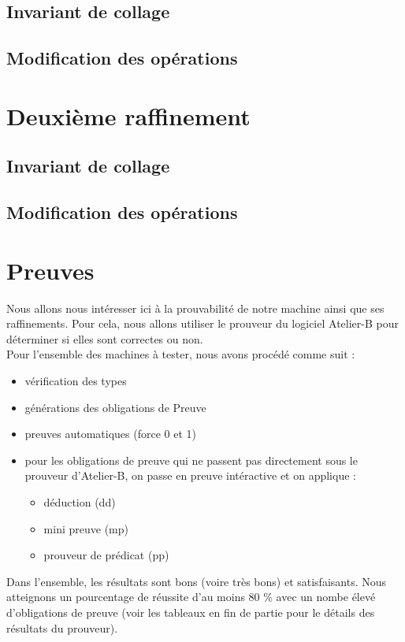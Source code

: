 \documentclass[12pt]{article}
\begin{document}
\subsection{Invariant de collage}
\subsection{Modification des opérations}
\newpage
\section{Deuxième raffinement}
\subsection{Invariant de collage}
\subsection{Modification des opérations}
\newpage
\section{Preuves}
Nous allons nous intéresser ici à la prouvabilité de notre machine ainsi que ses raffinements. Pour cela, nous allons utiliser le prouveur du logiciel Atelier-B pour déterminer si elles sont correctes ou non.\\

Pour l'ensemble des machines à tester, nous avons procédé comme suit :
\begin{itemize}
  \item vérification des types
  \item générations des obligations de Preuve
  \item preuves automatiques (force 0 et 1)
  \item pour les obligations de preuve qui ne passent pas directement sous le prouveur d'Atelier-B, on passe en preuve intéractive et on applique :
  \begin{itemize}
    \item déduction (dd)
    \item mini preuve (mp)
    \item prouveur de prédicat (pp)
  \end{itemize}
\end{itemize}

Dans l'ensemble, les résultats sont bons (voire très bons) et satisfaisants. Nous atteignons un pourcentage de réussite d'au moins 80 \% avec un nombe élevé d'obligations de preuve (voir les tableaux en fin de partie pour le détails des résultats du prouveur).\\
\end{document}
